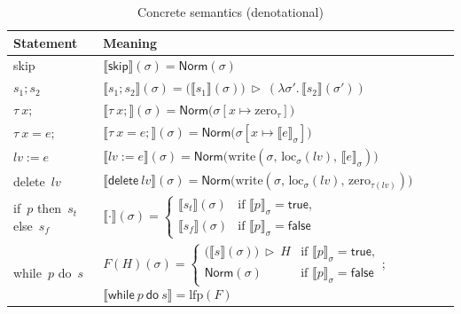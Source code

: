 \documentclass[pdflatex,sn-basic]{sn-jnl}%
\theoremstyle{thmstyleone}%
\theoremstyle{thmstyletwo}%
\theoremstyle{thmstylethree}%
\newcommand{\Norm}{\mathsf{Norm}}
\begin{document}
\begin{table}[t]
  \caption{Concrete semantics (denotational)}
  \label{tab:conc-denot}
  \centering
  \small
  \setlength{\tabcolsep}{6pt}
  \renewcommand{\arraystretch}{1.12}
  \begin{tabularx}{\columnwidth}{@{}l X@{}}
    \toprule
    \textbf{Statement} & \textbf{Meaning} \\
    \midrule
    \textsf{skip} &
    $\llbracket \textsf{skip}\rrbracket(\sigma)=\Norm(\sigma)$\\

    $s_1; s_2$ &
    $\llbracket s_1; s_2\rrbracket(\sigma)=\big(\llbracket s_1\rrbracket(\sigma)\big)\ \triangleright\ (\lambda \sigma'.\,\llbracket s_2\rrbracket(\sigma'))$\\

    $\tau\ x;$ &
    $\llbracket \tau\ x;\rrbracket(\sigma)=\Norm\!\big(\sigma[x\mapsto \mathrm{zero}_\tau]\big)$\\

    $\tau\ x=e;$ &
    $\llbracket \tau\ x=e;\rrbracket(\sigma)=\Norm\!\big(\sigma[x\mapsto \llbracket e\rrbracket_\sigma]\big)$\\

    $\mathit{lv}:=e$ &
    $\llbracket \mathit{lv}:=e\rrbracket(\sigma)=\Norm\!\big(\mathrm{write}(\sigma,\,\mathrm{loc}_\sigma(\mathit{lv}),\,\llbracket e\rrbracket_\sigma)\big)$\\

    \textsf{delete}\ $\mathit{lv}$ &
    $\llbracket \textsf{delete}\ \mathit{lv}\rrbracket(\sigma)=\Norm\!\big(\mathrm{write}(\sigma,\,\mathrm{loc}_\sigma(\mathit{lv}),\,\mathrm{zero}_{\tau(\mathit{lv})})\big)$\\

    \textsf{if}\ $p$ \textsf{then}\ $s_t$ \textsf{else}\ $s_f$ &
    $\llbracket \cdot\rrbracket(\sigma)=
      \begin{cases}
        \llbracket s_t\rrbracket(\sigma) & \text{if }\llbracket p\rrbracket_\sigma=\mathsf{true},\\
        \llbracket s_f\rrbracket(\sigma) & \text{if }\llbracket p\rrbracket_\sigma=\mathsf{false}
      \end{cases}$\\

    \textsf{while}\ $p$ \textsf{do}\ $s$ &
    $F(H)(\sigma)=
      \begin{cases}
        \big(\llbracket s\rrbracket(\sigma)\big)\ \triangleright\ H & \text{if }\llbracket p\rrbracket_\sigma=\mathsf{true},\\
        \Norm(\sigma) & \text{if }\llbracket p\rrbracket_\sigma=\mathsf{false}
      \end{cases}$;
    $\llbracket \textsf{while}\ p\ \textsf{do}\ s\rrbracket=\mathrm{lfp}(F)$\\


\end{tabularx}
\end{table}
\end{document}
